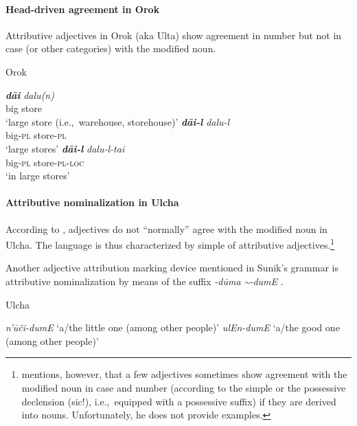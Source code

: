 \paragraph*{Head\hyp{}driven agreement in Orok}
Attributive adjectives in Orok (aka Ulta) show agreement in number but not in case (or other categories) with the modified noun.
\begin{exe}
\ex 
\rm{Orok \citep[55]{petrova1967}}
\begin{xlist}
\ex
\gll \textit{\textbf{dāi}} \textit{dalu(n)}\\
	big store\\
\glt ‘large store (i.e.,~warehouse, storehouse)’
\ex 
\gll	\textit{\textbf{dāi-l}} \textit{dalu-l}\\
	big-\textsc{pl} store-\textsc{pl}\\
\glt	‘large stores’
\ex 
\gll	\textit{\textbf{dāi-l}} \textit{dalu-l-tai}\\
	big-\textsc{pl} store-\textsc{pl}-\textsc{loc}\\
\glt	‘in large stores’
\end{xlist}
\end{exe}

\paragraph*{Attributive nominalization in Ulcha}
According to \citet[36, 52–53]{sunik1985}, adjectives do not “normally” agree with the modified noun in Ulcha. The language is thus characterized by simple  of attributive adjectives.\footnote{\citet[36]{sunik1985} mentions, however, that a few adjectives sometimes show agreement with the modified noun in case and number (according to the simple or the possessive declension (sic!), i.e.,~equipped with a possessive suffix) if they are derived into nouns. Unfortunately, he does not provide examples.}

Another adjective attribution marking device mentioned in Sunik's grammar is attributive nominalization by means of the suffix \textit{-d\.uma \textasciitilde-dumE} \citep{sunik1985}.
\begin{exe}
\ex 
\rm{Ulcha \citep[38]{sunik1985}}
\begin{xlist}
\ex \textit{n'ūči-dumE} \rm{‘a/the little one (among other people)’}
\ex \textit{ulEn-dumE} \rm{‘a/the good one (among other people)’}
\end{xlist}
\end{exe}


